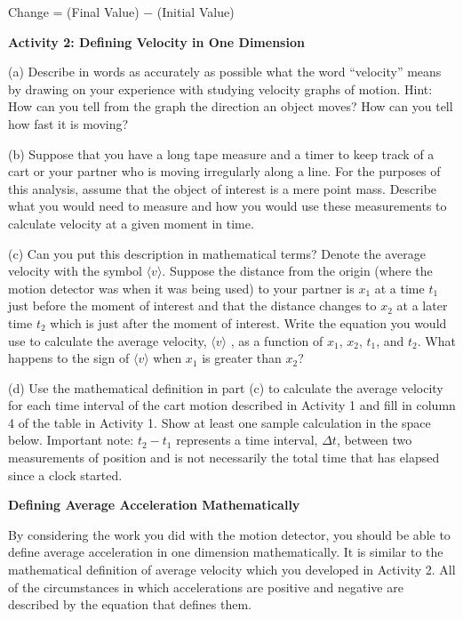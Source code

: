 {\par\centering Change = (Final Value) $-$ (Initial Value)\par}

\textbf{Activity 2: Defining Velocity in One Dimension} 

(a) Describe in words as accurately as possible what the word ``velocity''
means by drawing on your experience with studying velocity graphs of motion.
Hint: How can you tell from the graph the direction an object moves? How can
you tell how fast it is moving?
\vspace{20mm}

(b) Suppose that you have a long tape measure and a timer to keep track of a
cart or your partner who is moving irregularly along a line. For the purposes
of this analysis, assume that the object of interest is a mere point mass. Describe
what you would need to measure and how you would use these measurements to calculate
velocity at a given moment in time.
\vspace{20mm}

(c) Can you put this description in mathematical terms? Denote the
average velocity with the symbol $\langle v\rangle$. Suppose the
distance from the origin (where the motion detector was when it was
being used) to your partner is \( x_{1} \) at a time \( t_{1} \) just
before the moment of interest and that the distance changes to \(
x_{2} \) at a later time \( t_{2} \) which is just after the moment of
interest. Write the equation you would use to calculate the average
velocity, $\langle v\rangle$ , as a function of \( x_{1} \), \( x_{2} \), 
\( t_{1}
\), and \( t_{2} \).  What happens to the sign of $\langle v\rangle$
when \( x_{1}
\) is greater than \( x_{2} \)?
\vspace{20mm}

(d) Use the mathematical definition in part (c) to calculate the average velocity
for each time interval of the cart motion described in Activity 1 and fill in
column 4 of the table in Activity 1. Show at least one sample calculation in
the space below. Important note: \( t_{2}  - t_{1} \) represents a time
interval, \( \Delta  t\), between two measurements of position and is not necessarily
the total time that has elapsed since a clock started.
\vspace{20mm}

\textbf{Defining Average Acceleration Mathematically} 

By considering the work you did with the motion detector, you should be able
to define average acceleration in one dimension mathematically. It is similar
to the mathematical definition of average velocity which you developed in Activity
2. All of the circumstances in which accelerations are positive and negative
are described by the equation that defines them. 

